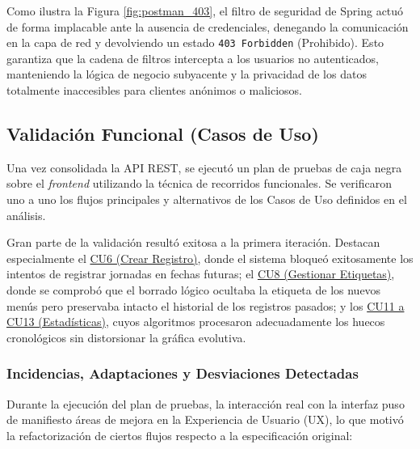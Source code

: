 Como ilustra la Figura \ref{fig:postman_403}, el filtro de seguridad de Spring actuó de forma implacable ante la ausencia de credenciales, denegando la comunicación en la capa de red y devolviendo un estado \texttt{403 Forbidden} (Prohibido). Esto garantiza que la cadena de filtros intercepta a los usuarios no autenticados, manteniendo la lógica de negocio subyacente y la privacidad de los datos totalmente inaccesibles para clientes anónimos o maliciosos.

\subsection{Validación Funcional (Casos de Uso)}

Una vez consolidada la API REST, se ejecutó un plan de pruebas de caja negra sobre el \textit{frontend} utilizando la técnica de recorridos funcionales. Se verificaron uno a uno los flujos principales y alternativos de los Casos de Uso definidos en el análisis.

Gran parte de la validación resultó exitosa a la primera iteración. Destacan especialmente el \hyperref[tab:esp_cu6]{CU6 (Crear Registro)}, donde el sistema bloqueó exitosamente los intentos de registrar jornadas en fechas futuras; el \hyperref[tab:esp_cu8]{CU8 (Gestionar Etiquetas)}, donde se comprobó que el borrado lógico ocultaba la etiqueta de los nuevos menús pero preservaba intacto el historial de los registros pasados; y los \hyperref[tab:esp_cu11]{CU11 a CU13 (Estadísticas)}, cuyos algoritmos procesaron adecuadamente los huecos cronológicos sin distorsionar la gráfica evolutiva.

\subsubsection{Incidencias, Adaptaciones y Desviaciones Detectadas}

Durante la ejecución del plan de pruebas, la interacción real con la interfaz puso de manifiesto áreas de mejora en la Experiencia de Usuario (UX), lo que motivó la refactorización de ciertos flujos respecto a la especificación original:

